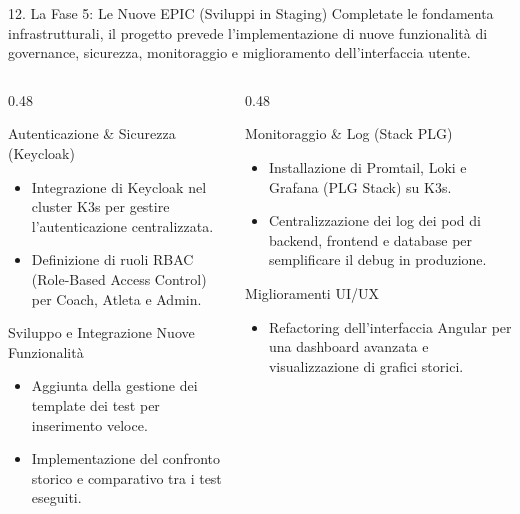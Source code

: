 \documentclass[aspectratio=169, 10pt]{beamer}
\begin{document}
\begin{frame}{12. La Fase 5: Le Nuove EPIC (Sviluppi in Staging)}
  Completate le fondamenta infrastrutturali, il progetto prevede l'implementazione di nuove funzionalità di governance, sicurezza, monitoraggio e miglioramento dell'interfaccia utente.
  \vspace{0.3cm}
  \begin{columns}
    \begin{column}{0.48\textwidth}
      \begin{block}{Autenticazione \& Sicurezza (Keycloak)}
        \begin{itemize}
          \item Integrazione di Keycloak nel cluster K3s per gestire l'autenticazione centralizzata.
          \item Definizione di ruoli RBAC (Role-Based Access Control) per Coach, Atleta e Admin.
        \end{itemize}
      \end{block}
      \begin{block}{Sviluppo e Integrazione Nuove Funzionalità}
        \begin{itemize}
          \item Aggiunta della gestione dei template dei test per inserimento veloce.
          \item Implementazione del confronto storico e comparativo tra i test eseguiti.
        \end{itemize}
      \end{block}
    \end{column}
    \begin{column}{0.48\textwidth}
      \begin{block}{Monitoraggio \& Log (Stack PLG)}
        \begin{itemize}
          \item Installazione di Promtail, Loki e Grafana (PLG Stack) su K3s.
          \item Centralizzazione dei log dei pod di backend, frontend e database per semplificare il debug in produzione.
        \end{itemize}
      \end{block}
      \begin{block}{Miglioramenti UI/UX}
        \begin{itemize}
          \item Refactoring dell'interfaccia Angular per una dashboard avanzata e visualizzazione di grafici storici.
        \end{itemize}
      \end{block}
    \end{column}
  \end{columns}
\end{frame}
\end{document}
